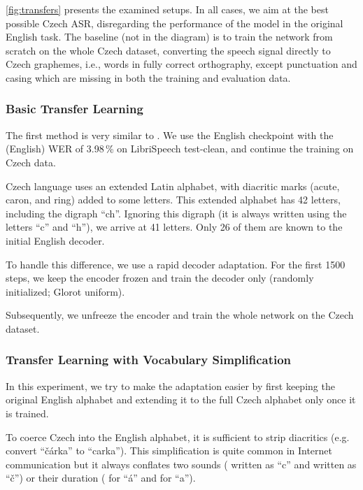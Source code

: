 \cref{fig:transfers} presents the examined setups. In all cases, we aim at the best possible Czech ASR, disregarding the performance of the model in the original English task. The baseline (not in the diagram) is to train the network from scratch on the whole Czech dataset, converting the speech signal directly to Czech graphemes, i.e., words in fully correct orthography, except punctuation and casing which are missing in both the training and evaluation data.

\subsubsection{Basic Transfer Learning}
\label{basic_transfer}

The first method is very similar to . We use the English checkpoint with the (English) WER of 3.98\,\% on LibriSpeech test-clean, and continue the training on Czech data.

Czech language uses an extended Latin alphabet, with diacritic marks (acute, caron, and ring) added to some letters. This extended alphabet has 42 letters, including the digraph ``ch''. Ignoring this digraph (it is always written using the letters ``c'' and ``h''), we arrive at 41 letters. Only 26 of them are known to the initial English decoder.

To handle this difference, we use a rapid decoder adaptation. For the first 1500 steps, we keep the encoder frozen and train the decoder only (randomly initialized; Glorot uniform).

Subsequently, we unfreeze the encoder and train the whole network on the Czech dataset.

\subsubsection{Transfer Learning with Vocabulary Simplification}

In this experiment, we try to make the adaptation easier by first keeping the original English alphabet and extending it to the full Czech alphabet only once it is trained.

To coerce Czech into the English alphabet, it is sufficient to strip diacritics (e.g. convert ``\v{c}\'arka'' to ``carka''). This simplification is quite common in Internet communication but it always conflates two sounds (\textipa{[ts]} written as ``c'' and \textipa{[tS]} written as ``\v{c}'')  or their duration (\textipa{[a:]} for ``\'a'' and \textipa{[a]} for ``a'').

